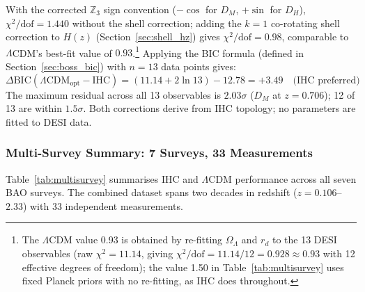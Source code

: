 \documentclass[12pt,a4paper]{article}
\begin{document}
With the corrected $\mathbb{Z}_3$ sign convention ($-\cos$ for $D_M$, $+\sin$ for $D_H$),
$\chi^2/\mathrm{dof} = 1.440$ without the shell correction; adding the $k=1$
co-rotating shell correction to $H(z)$ (Section~\ref{sec:shell_hz}) gives
$\chi^2/\mathrm{dof} = 0.98$, comparable to $\Lambda$CDM's best-fit value of
$0.93$.\footnote{The $\Lambda$CDM value 0.93 is obtained by re-fitting $\Omega_\Lambda$
and $r_d$ to the 13 DESI observables (raw $\chi^2 = 11.14$, giving
$\chi^2/\mathrm{dof} = 11.14/12 = 0.928 \approx 0.93$ with 12 effective
degrees of freedom); the value 1.50
in Table~\ref{tab:multisurvey} uses fixed Planck priors with no re-fitting, as IHC
does throughout.}
Applying the BIC formula (defined in Section~\ref{sec:boss_bic}) with $n = 13$ data
points gives:
\begin{equation}
  \Delta\mathrm{BIC}(\Lambda\mathrm{CDM}_\mathrm{opt}-\mathrm{IHC})
  = (11.14 + 2\ln 13) - 12.78 = +3.49
  \quad\text{(IHC preferred)}
\end{equation}
The maximum residual across all 13 observables is $2.03\sigma$ ($D_M$ at $z = 0.706$);
12 of 13 are within $1.5\sigma$. Both corrections derive from IHC topology; no parameters
are fitted to DESI data.

\subsubsection{Multi-Survey Summary: 7 Surveys, 33 Measurements}
\label{sec:multisurvey}

Table~\ref{tab:multisurvey} summarises IHC and $\Lambda$CDM performance across all
seven BAO surveys. The combined dataset spans two decades in redshift ($z = 0.106$--$2.33$)
with 33 independent measurements.
\end{document}
